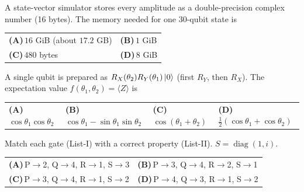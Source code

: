 \documentclass[11pt,a4paper]{article}
\newcommand{\optlabel}[1]{\textbf{(#1)}}
\newenvironment{qitem}[1]{\begin{list}{}{\setlength{\leftmargin}{3.3em}\setlength{\labelwidth}{3.1em}%
  \setlength{\labelsep}{0.2em}\setlength{\topsep}{3pt}\setlength{\parsep}{3pt}}\item[\textbf{Q.#1}\hfill]}{\end{list}}
\newcommand{\qsep}{\par\vspace{2pt}{\color{black!15}\hrule}\vspace{4pt}}
\begin{document}
\begin{qitem}{33}
A state-vector simulator stores every amplitude as a double-precision complex number (16 bytes). The memory
needed for one 30-qubit state is
\par\smallskip\noindent\begin{tabularx}{\linewidth}{@{}*{2}{L}@{}}
\optlabel{A}\,$16$ GiB (about $17.2$ GB) & \optlabel{B}\,$1$ GiB \\[3pt]
\optlabel{C}\,$480$ bytes & \optlabel{D}\,$8$ GiB
\end{tabularx}
\end{qitem}
\qsep

\begin{qitem}{34}
A single qubit is prepared as $R_X(\theta_2)R_Y(\theta_1)\ket0$ (first $R_Y$, then $R_X$). The expectation value
$f(\theta_1, \theta_2) = \langle Z\rangle$ is
\par\smallskip\noindent\begin{tabularx}{\linewidth}{@{}*{4}{L}@{}}
\optlabel{A}\,$\cos\theta_1\cos\theta_2$ & \optlabel{B}\,$\cos\theta_1 - \sin\theta_1\sin\theta_2$ & \optlabel{C}\,$\cos(\theta_1 + \theta_2)$ & \optlabel{D}\,$\tfrac12(\cos\theta_1 + \cos\theta_2)$
\end{tabularx}
\end{qitem}
\qsep

\begin{qitem}{35}
Match each gate (List-I) with a correct property (List-II). $S = \operatorname{diag}(1, i)$.
\par\smallskip{}
\par\smallskip\noindent\begin{tabularx}{\linewidth}{@{}*{2}{L}@{}}
\optlabel{A}\,P$\to$2, Q$\to$4, R$\to$1, S$\to$3 & \optlabel{B}\,P$\to$3, Q$\to$4, R$\to$2, S$\to$1 \\[3pt]
\optlabel{C}\,P$\to$3, Q$\to$4, R$\to$1, S$\to$2 & \optlabel{D}\,P$\to$4, Q$\to$3, R$\to$1, S$\to$2
\end{tabularx}
\end{qitem}
\qsep
\end{document}
